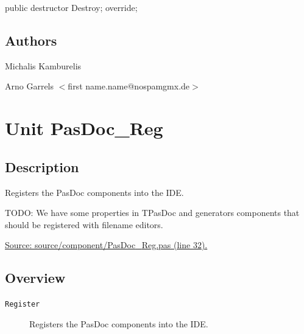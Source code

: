 \documentclass{report}
\newif\ifpdf
\begin{document}
\label{PasDoc_ProcessLineTalk.TProcessLineTalk-Destroy}
\begin{list}{}{
\setlength{\itemindent}{0cm}
\setlength{\listparindent}{0cm}
\setlength{\leftmargin}{\evensidemargin}
\addtolength{\leftmargin}{\tmplength}
\settowidth{\labelsep}{X}
\addtolength{\leftmargin}{\labelsep}
\setlength{\labelwidth}{\tmplength}
}
\item[\textbf{Declaration}\hfill]
\ifpdf
\begin{flushleft}
\fi
\begin{ttfamily}
public destructor Destroy; override;\end{ttfamily}

\ifpdf
\end{flushleft}
\fi

\end{list}
\section{Authors}
\par
Michalis Kamburelis

\par
Arno Garrels {$<$}first name.name@nospamgmx.de{$>$}

\chapter{Unit PasDoc{\_}Reg}
\label{PasDoc_Reg}
\section{Description}
Registers the PasDoc components into the IDE. \hfill\vspace*{1ex}

   

TODO: We have some properties in TPasDoc and generators components that should be registered with filename editors.\par
\href{https://github.com/pasdoc/pasdoc/blob/master/source/component/PasDoc_Reg.pas#L32}{Source: source/component/PasDoc{\_}Reg.pas (line 32).}
\section{Overview}
\begin{description}
\item[\texttt{Register}]Registers the PasDoc components into the IDE.
\end{description}
\end{document}
